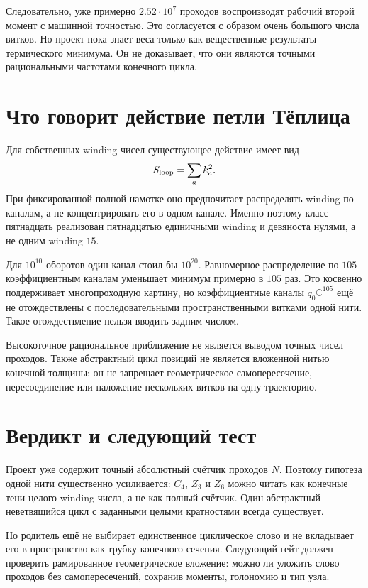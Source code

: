Следовательно, уже примерно $2.52\cdot10^7$ проходов воспроизводят
рабочий второй момент с машинной точностью. Это согласуется с образом
очень большого числа витков. Но проект пока знает веса только как
вещественные результаты термического минимума. Он не доказывает, что они
являются точными рациональными частотами конечного цикла.

\section{Что говорит действие петли Тёплица}

Для собственных winding-чисел существующее действие имеет вид
\begin{equation}
 S_{\rm loop}=\sum_a k_a^2.
\end{equation}
При фиксированной полной намотке оно предпочитает распределять winding по
каналам, а не концентрировать его в одном канале. Именно поэтому класс
пятнадцать реализован пятнадцатью единичными winding и девяноста нулями,
а не одним winding $15$.

Для $10^{10}$ оборотов один канал стоил бы $10^{20}$. Равномерное
распределение по $105$ коэффициентным каналам уменьшает минимум примерно
в $105$ раз. Это косвенно поддерживает многопроходную картину, но
коэффициентные каналы $q_0\mathbb C^{105}$ ещё не отождествлены с
последовательными пространственными витками одной нити. Такое
отождествление нельзя вводить задним числом.

\begin{nogocriterion}
Высокоточное рациональное приближение не является выводом точных чисел
проходов. Также абстрактный цикл позиций не является вложенной нитью
конечной толщины: он не запрещает геометрическое самопересечение,
пересоединение или наложение нескольких витков на одну траекторию.
\end{nogocriterion}

\section{Вердикт и следующий тест}

Проект уже содержит точный абсолютный счётчик проходов $N$. Поэтому
гипотеза одной нити существенно усиливается: $C_4$, $Z_3$ и $Z_6$ можно
читать как конечные тени целого winding-числа, а не как полный счётчик.
Один абстрактный неветвящийся цикл с заданными целыми кратностями всегда
существует.

Но родитель ещё не выбирает единственное циклическое слово и не вкладывает
его в пространство как трубку конечного сечения. Следующий гейт должен
проверить рамированное геометрическое вложение: можно ли уложить слово
проходов без самопересечений, сохранив моменты, голономию и тип узла.

